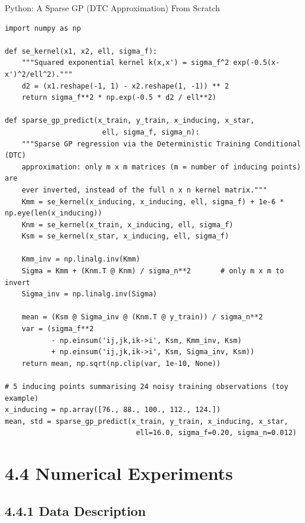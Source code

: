\documentclass[aspectratio=169,10pt]{beamer}
\begin{document}
\begin{frame}[fragile]{Python: A Sparse GP (DTC Approximation) From Scratch}
\begin{lstlisting}[style=python]
import numpy as np

def se_kernel(x1, x2, ell, sigma_f):
    """Squared exponential kernel k(x,x') = sigma_f^2 exp(-0.5(x-x')^2/ell^2)."""
    d2 = (x1.reshape(-1, 1) - x2.reshape(1, -1)) ** 2
    return sigma_f**2 * np.exp(-0.5 * d2 / ell**2)

def sparse_gp_predict(x_train, y_train, x_inducing, x_star,
                       ell, sigma_f, sigma_n):
    """Sparse GP regression via the Deterministic Training Conditional (DTC)
    approximation: only m x m matrices (m = number of inducing points) are
    ever inverted, instead of the full n x n kernel matrix."""
    Kmm = se_kernel(x_inducing, x_inducing, ell, sigma_f) + 1e-6 * np.eye(len(x_inducing))
    Knm = se_kernel(x_train, x_inducing, ell, sigma_f)
    Ksm = se_kernel(x_star, x_inducing, ell, sigma_f)

    Kmm_inv = np.linalg.inv(Kmm)
    Sigma = Kmm + (Knm.T @ Knm) / sigma_n**2       # only m x m to invert
    Sigma_inv = np.linalg.inv(Sigma)

    mean = (Ksm @ Sigma_inv @ (Knm.T @ y_train)) / sigma_n**2
    var = (sigma_f**2
           - np.einsum('ij,jk,ik->i', Ksm, Kmm_inv, Ksm)
           + np.einsum('ij,jk,ik->i', Ksm, Sigma_inv, Ksm))
    return mean, np.sqrt(np.clip(var, 1e-10, None))

# 5 inducing points summarising 24 noisy training observations (toy example)
x_inducing = np.array([76., 88., 100., 112., 124.])
mean, std = sparse_gp_predict(x_train, y_train, x_inducing, x_star,
                               ell=16.0, sigma_f=0.20, sigma_n=0.012)
\end{lstlisting}
\end{frame}

\section{4.4 Numerical Experiments}

\subsection{4.4.1 Data Description}
\end{document}
